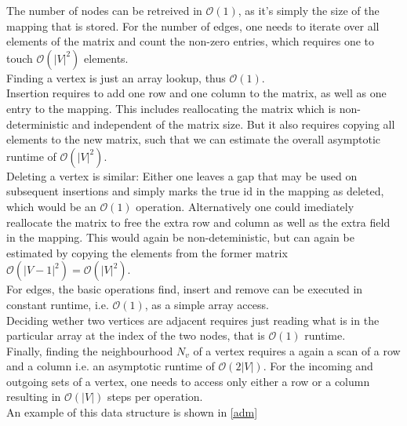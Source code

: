         The number of nodes can be retreived in $\mathcal{O}(1)$, as it's simply the size of the mapping that is stored.
        For the number of edges, one needs to iterate over all elements of the matrix and count the non-zero entries, which requires one to touch $\mathcal{O}(|V|^2)$ elements.\\

        Finding a vertex is just an array lookup, thus $\mathcal{O}(1)$. \\

        Insertion requires to add one row and one column to the matrix, as well as one entry to the mapping. 
        This includes reallocating the matrix which is non-deterministic and independent of the matrix size. But it also requires copying all elements to the new matrix, such that we can estimate the overall asymptotic runtime of $\mathcal{O}(|V|^2)$. \\
        
        Deleting a vertex is similar: Either one leaves a gap that may be used on subsequent insertions and simply marks the true id in the mapping as deleted, which would be an $\mathcal{O}(1)$ operation. 
        Alternatively one could imediately reallocate the matrix to free the extra row and column as well as the extra field in the mapping. 
        This would again be non-deteministic, but can again be estimated by copying the elements from the former matrix $\mathcal{O}(|V-1|^2) = \mathcal{O}(|V|^2)$. \\
        
        For edges, the basic operations find, insert and remove can be executed in constant runtime, i.e. $\mathcal{O}(1)$, as a simple array access. \\
        
        Deciding wether two vertices are adjacent requires just reading what is in the particular array at the index of the two nodes, that is $\mathcal{O}(1)$ runtime.\\
        
        Finally, finding the neighbourhood $N_v$ of a vertex requires a again a scan of a row and a column i.e. an asymptotic runtime of $\mathcal{O}(2|V|)$. For the incoming and outgoing sets of a vertex, one needs to access only either a row or a column resulting in $\mathcal{O}(|V|)$ steps per operation. \\
        
        An example of this data structure is shown in \ref{adm}
        
